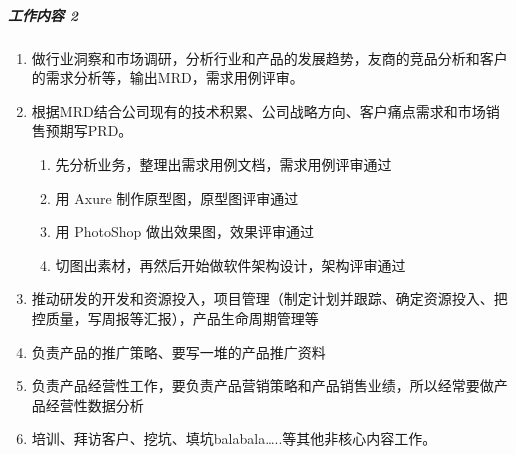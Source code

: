 \documentclass[letterpaper,11pt,english]{sphinxmanual}
\begin{document}
\begin{center}\end{center}  


\subparagraph{工作内容 2\sphinxfootnotemark[146]}
\label{\detokenize{chapter_introduction/PM:id25}}%
\begin{footnotetext}[146]\sphinxAtStartFootnote
{}
%
\end{footnotetext}\ignorespaces \begin{enumerate}
%
\item {} 
做行业洞察和市场调研，分析行业和产品的发展趋势，友商的竞品分析和客户的需求分析等，输出MRD，需求用例评审。

\item {} 
根据MRD结合公司现有的技术积累、公司战略方向、客户痛点需求和市场销售预期写PRD。
\begin{enumerate}
%
\item {} 
先分析业务，整理出需求用例文档，需求用例评审通过%
\begin{footnote}[147]\sphinxAtStartFootnote
{}
%
\end{footnote}

\item {} 
用 Axure 制作原型图，原型图评审通过

\item {} 
用 PhotoShop 做出效果图，效果评审通过

\item {} 
切图出素材，再然后开始做软件架构设计，架构评审通过

\end{enumerate}

\item {} 
推动研发的开发和资源投入，项目管理（制定计划并跟踪、确定资源投入、把控质量，写周报等汇报），产品生命周期管理等

\item {} 
负责产品的推广策略、要写一堆的产品推广资料

\item {} 
负责产品经营性工作，要负责产品营销策略和产品销售业绩，所以经常要做产品经营性数据分析

\item {} 
培训、拜访客户、挖坑、填坑balabala…..等其他非核心内容工作。

\end{enumerate}
\end{document}
